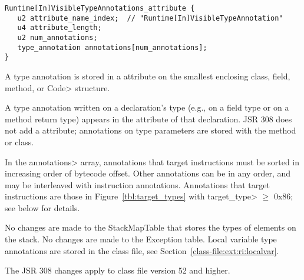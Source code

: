 \documentclass[10pt]{article}
\begin{document}
\preverbnegspace
\begin{Verbatim}
Runtime[In]VisibleTypeAnnotations_attribute {
   u2 attribute_name_index;  // "Runtime[In]VisibleTypeAnnotation"
   u4 attribute_length;
   u2 num_annotations;
   type_annotation annotations[num_annotations];
}
\end{Verbatim}


A type annotation is stored in a \RuntimeInOrVisibleTypeAnnotations attribute
on the smallest enclosing class, field, method, or \<Code> structure.

A type annotation written on a declaration's type (e.g., on a field type or
on a method return type)
appears in the \RuntimeInOrVisibleTypeAnnotations attribute of that declaration.
JSR 308 does not add a \RuntimeInOrVisibleTypeParameterAnnotations
attribute; annotations on type parameters are stored with the method or class.

In the \<annotations> array, annotations that target instructions must be
sorted in increasing order of bytecode offset.  Other annotations can be in
any order, and may be interleaved with instruction annotations.
Annotations that target instructions are those in
Figure~\ref{tbl:target_types} with \<target\_type> $\ge$ 0x86; see below
for details.

No changes are made to the StackMapTable that stores the types of elements
on the stack.
No changes are made to the Exception table.
Local variable type annotations are stored in the class file, see
Section~\ref{class-file:ext:ri:localvar}.

The JSR 308 changes apply to class file version 52 and higher.
\end{document}
